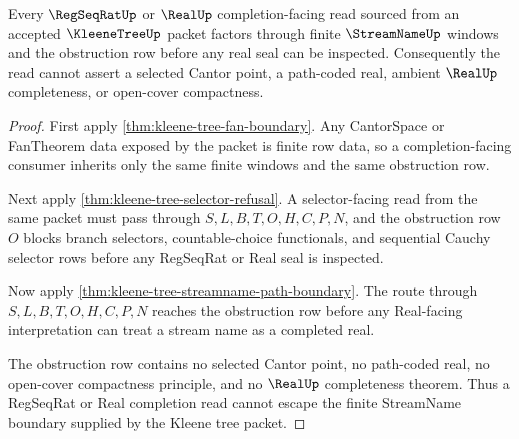 \begin{theorem}
\label{thm:kleene-tree-real-completion-nonescape}
Every $\RegSeqRatUp$ or $\RealUp$ completion-facing read sourced from an accepted $\KleeneTreeUp$ packet factors through finite $\StreamNameUp$ windows and the obstruction row before any real seal can be inspected. Consequently the read cannot assert a selected Cantor point, a path-coded real, ambient $\RealUp$ completeness, or open-cover compactness.
\end{theorem}
\begin{proof}
First apply \autoref{thm:kleene-tree-fan-boundary}. Any CantorSpace or FanTheorem data exposed by the packet is finite row data, so a completion-facing consumer inherits only the same finite windows and the same obstruction row.

Next apply \autoref{thm:kleene-tree-selector-refusal}. A selector-facing read from the same packet must pass through $S,L,B,T,O,H,C,P,N$, and the obstruction row $O$ blocks branch selectors, countable-choice functionals, and sequential Cauchy selector rows before any RegSeqRat or Real seal is inspected.

Now apply \autoref{thm:kleene-tree-streamname-path-boundary}. The route through $S,L,B,T,O,H,C,P,N$ reaches the obstruction row before any Real-facing interpretation can treat a stream name as a completed real.

The obstruction row contains no selected Cantor point, no path-coded real, no open-cover compactness principle, and no $\RealUp$ completeness theorem. Thus a RegSeqRat or Real completion read cannot escape the finite StreamName boundary supplied by the Kleene tree packet.
\end{proof}

